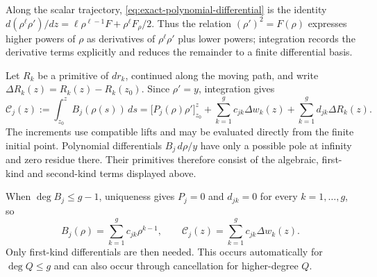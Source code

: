 \documentclass[11pt]{article}
\begin{document}
Along the scalar trajectory, \eqref{eq:exact-polynomial-differential} is the identity
$d(\rho^\ell\rho')/dz=\ell\rho^{\ell-1}F+\rho^\ell F_\rho/2$.
Thus the relation $(\rho')^2=F(\rho)$ expresses higher powers of $\rho$ as derivatives of $\rho^\ell\rho'$ plus lower powers; integration records the derivative terms explicitly and reduces the remainder to a finite differential basis.

Let $R_k$ be a primitive of $dr_k$, continued along the moving path, and write $\Delta R_k(z)=R_k(z)-R_k(z_0)$. Since $\rho'=y$, integration gives
\begin{equation}\label{eq:B-integral}
\mathcal C_j(z):=\int_{z_0}^z B_j(\rho(s))\,ds
=\bigl[P_j(\rho)\rho'\bigr]_{z_0}^z
+\sum_{k=1}^g c_{jk}\Delta w_k(z)+\sum_{k=1}^g d_{jk}\Delta R_k(z).
\end{equation}
The increments use compatible lifts and may be evaluated directly from the finite initial point. Polynomial differentials $B_j\,d\rho/y$ have only a possible pole at infinity and zero residue there. Their primitives therefore consist of the algebraic, first-kind and second-kind terms displayed above.

When $\deg B_j\le g-1$, uniqueness gives $P_j=0$ and $d_{jk}=0$ for every $k=1,\ldots,g$, so
\begin{equation}\label{eq:degree-condition}
B_j(\rho)=\sum_{k=1}^g c_{jk}\rho^{k-1},\qquad
\mathcal C_j(z)=\sum_{k=1}^g c_{jk}\Delta w_k(z).
\end{equation}
Only first-kind differentials are then needed. This occurs automatically for $\deg Q\le g$ and can also occur through cancellation for higher-degree $Q$.
\end{document}

